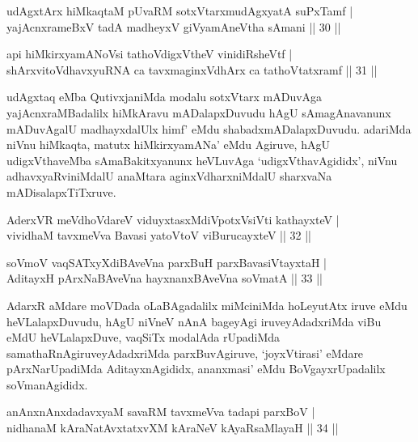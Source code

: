 \begin{shl}
udAgxtArx hiMkaqtaM pUvaRM sotxVtarxmudAgxyatA suPxTamf | \\
yajAcnxrameBxV tadA madheyxV giVyamAneV\s tha sAmani \hfill|| 30 || 
\end{shl}

\begin{shl}
api hiMkirxyamANoV\s si tathoVdigxVtheV vinidiRsheVtf | \\
shArxvitoV\s dhavxyuRNA ca tavxmaginxVdhArx ca tathoVtatxramf \hfill|| 31 || 
\end{shl}

\begin{artha}
udAgxtaq eMba QutivxjaniMda modalu sotxVtarx mADuvAga yajAcnxraMBadalilx hiMkAravu mADalapxDuvudu hAgU sAmagAnavanunx mADuvAgalU madhayxdalUlx himf' eMdu shabadx\break mADalapxDuvudu. adariMda niVnu hiMkaqta, matutx hiMkirxyamANa' eMdu Agiruve, hAgU udigxVthaveMba sAmaBakitxyanunx heVLuvAga `udigxVthavAgididx', niVnu adhavxyaRviniMdalU anaMtara aginxVdharxniMdalU sharxvaNa mADisalapxTiTxruve.
\end{artha}


\begin{shl}
AderxVR meVdhoVdareV viduyxtasxMdiVpotxV\s siVti kathayxteV | \\
vividhaM tavxmeVva Bavasi yatoV\s toV viBurucayxteV \hfill|| 32 || 
\end{shl}

\begin{shl}
soVmoV vaqSATxyXdiBAveVna parxBuH parxBavasiVtayxtaH | \\
AditayxH pArxNaBAveVna hayxnanxBAveVna soVmatA \hfill|| 33 || 
\end{shl}

\begin{artha}
AdarxR aMdare moVDada oLaBAgadalilx miMciniMda hoLeyutAtx iruve eMdu heVLalapxDuvudu, hAgU niVneV nAnA bageyAgi iruveyAdadxriMda viBu eMdU heVLalapxDuve, vaqSiTx modalAda rUpadiMda samathaRnAgiruveyAdadxriMda parxBuvAgiruve, `joyxVtirasi' eMdare pArxNarUpadiMda AditayxnAgididx, ananxmasi' eMdu BoVgayxrUpadalilx soVmanAgididx.
\end{artha}

\begin{shl}
anAnxnAnxdadavxyaM savaRM tavxmeVva tadapi parxBoV | \\
nidhanaM kAraNatAvxtatxvXM kAraNeV kAyaRsaMlayaH \hfill|| 34 || 
\end{shl}

